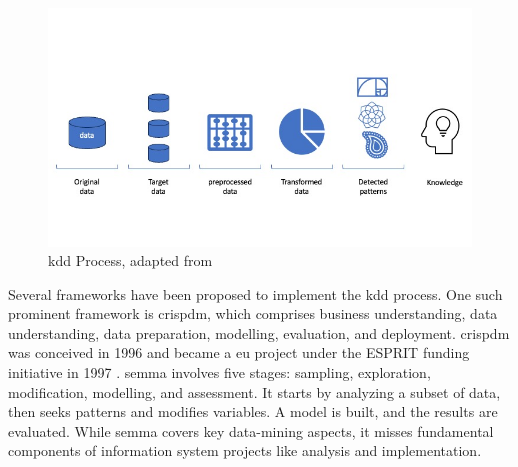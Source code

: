 \begin{figure}
\centering
\includegraphics[scale=0.55]{figures/imagens-tese.jpg}

\caption{\acl{kdd} Process, adapted from \cite{Fayyad_Piatetsky-Shapiro_Smyth_1996}} \label{fig:kdd-generic}
\end{figure}

Several frameworks have been proposed to implement the \ac{kdd} process. One such prominent framework is \ac{crispdm}, which comprises business understanding, data understanding, data preparation, modelling, evaluation, and deployment. \ac{crispdm} was conceived in 1996 and became a \ac{eu} project under the ESPRIT funding initiative in 1997 \cite{Chapman2000CRISPDM1S}. \ac{semma} \cite{rohanizadehProposedDataMining2009} involves five stages: sampling, exploration, modification, modelling, and assessment. It starts by analyzing a subset of data, then seeks patterns and modifies variables. A model is built, and the results are evaluated. While \ac{semma} covers key data-mining aspects, it misses fundamental components of information system projects like analysis and implementation.


